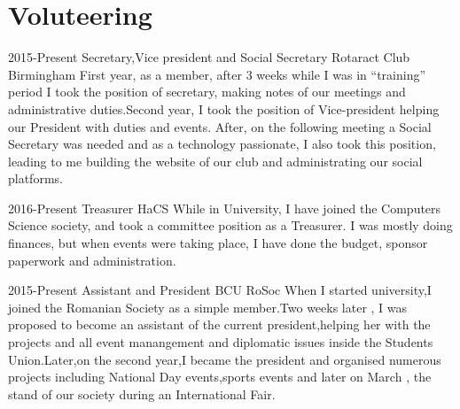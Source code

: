 \documentclass[]{friggeri-cv}
\begin{document}
\section{Voluteering}
\begin{entrylist}

    \entry
    {2015-Present}
    {Secretary,Vice president and Social Secretary}
    {Rotaract Club Birmingham}
    {First year, as a member, after 3 weeks while I was in “training” period I took the position of secretary, making notes of our meetings and administrative duties.Second year, I took the position of Vice-president helping our President with duties and events. After, on the following meeting a Social Secretary was needed and as a technology passionate, I also took this position, leading to me building the website of our club and administrating our social platforms.}
    ~
    
    \entry
    {2016-Present}
    {Treasurer}
    {HaCS}
    {While in University, I have joined the Computers Science society, and took a committee position as a Treasurer. I was mostly doing finances, but when events were taking place, I have done the budget, sponsor paperwork and administration.}
    ~ 
    
    \entry
    {2015-Present}
    {Assistant and President}
    {BCU RoSoc}
    {When I started university,I joined the Romanian Society as a simple member.Two weeks later , I was proposed to become an assistant of the current president,helping her with the projects and all event manangement and diplomatic issues inside the Students Union.Later,on the second year,I became the president and organised numerous projects including National Day events,sports events and later on March , the stand of our society during an International Fair.}
    
\end{entrylist}
    
\end{document}
